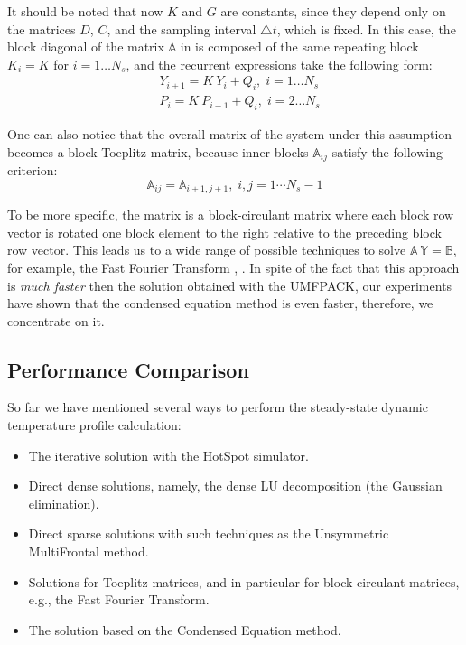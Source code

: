It should be noted that now $K$ and $G$ are constants, since they depend only on the matrices $D$, $C$, and the sampling interval $\triangle t$, which is fixed. In this case, the block diagonal of the matrix $\mathbb{A}$ in  is composed of the same repeating block $K_i = K$ for $i = 1 \dots N_s$, and the recurrent expressions take the following form:
\begin{align}
  & Y_{i + 1} = K \: Y_i + Q_i, \; i = 1 \dots N_s \nonumber \\
  & P_i = K \: P_{i - 1} + Q_i, \; i = 2 \dots N_s \nonumber
\end{align}

One can also notice that the overall matrix of the system under this assumption becomes a block Toeplitz matrix, because inner blocks $\mathbb{A}_{ij}$ satisfy the following criterion:
\[
  \mathbb{A}_{ij} = \mathbb{A}_{i+1, j+1}, \; i, j = 1 \cdots N_s - 1
\]

To be more specific, the matrix is a block-circulant matrix where each block row vector is rotated one block element to the right relative to the preceding block row vector. This leads us to a wide range of possible techniques to solve \mbox{$\mathbb{A} \: \mathbb{Y} = \mathbb{B}$}, for example, the Fast Fourier Transform \cite{mazancourt1983}, \cite{vescovo1997}. In spite of the fact that this approach is \emph{much faster} then the solution obtained with the UMFPACK, our experiments have shown that the condensed equation method is even faster, therefore, we concentrate on it.

\subsection{Performance Comparison}
So far we have mentioned several ways to perform the steady-state dynamic temperature profile calculation:
\begin{itemize}
  \item The iterative solution with the HotSpot simulator.
  \item Direct dense solutions, namely, the dense LU decomposition (the Gaussian elimination).
  \item Direct sparse solutions with such techniques as the Unsymmetric MultiFrontal method.
  \item Solutions for Toeplitz matrices, and in particular for block-circulant matrices, e.g., the Fast Fourier Transform.
  \item The solution based on the Condensed Equation method.
\end{itemize}

